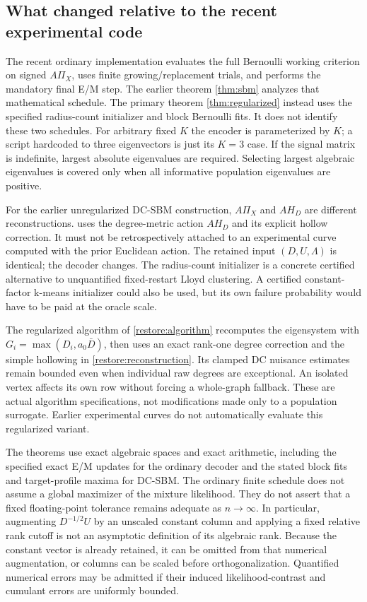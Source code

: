 \subsection{What changed relative to the recent experimental code}

The recent ordinary implementation evaluates the full Bernoulli working
criterion on signed $A\Pi_X$, uses finite growing/replacement trials, and
performs the mandatory final E/M step. The earlier theorem
\cref{thm:sbm} analyzes that mathematical schedule. The primary theorem
\cref{thm:regularized} instead uses the specified radius-count initializer
and block Bernoulli fits. It does not identify these two schedules.
For arbitrary fixed $K$ the encoder is parameterized
by $K$; a script hardcoded to three eigenvectors is just its $K=3$ case.
If the signal matrix is indefinite, largest absolute eigenvalues are
required. Selecting largest algebraic eigenvalues is covered only when
all informative population eigenvalues are positive.

For the earlier unregularized DC-SBM construction,
$A\Pi_X$ and $AH_D$ are different reconstructions.
 uses the degree-metric action
$AH_D$ and its explicit hollow correction. It must not be retrospectively
attached to an experimental curve computed with the prior Euclidean
action. The retained input $(D,U,\Lambda)$ is identical; the decoder
changes. The radius-count initializer is a concrete certified alternative
to unquantified fixed-restart Lloyd clustering. A certified constant-factor
k-means initializer could also be used, but its own failure probability
would have to be paid at the oracle scale.

The regularized algorithm of \cref{restore:algorithm} recomputes the
eigensystem with $G_i=\max(D_i,a_0\bar D)$, then uses an exact rank-one
degree correction and the simple hollowing in
\eqref{restore:reconstruction}. Its clamped DC nuisance estimates remain
bounded even when individual raw degrees are exceptional.
An isolated vertex affects its own row without forcing a whole-graph
fallback. These are actual algorithm specifications, not modifications
made only to a population surrogate. Earlier experimental curves do
not automatically evaluate this regularized variant.

The theorems use exact algebraic spaces and exact arithmetic, including
the specified exact E/M updates for the ordinary decoder and the stated
block fits and target-profile maxima for DC-SBM. The ordinary finite
schedule does not assume a global maximizer of the mixture likelihood.
They do not assert that a fixed floating-point tolerance remains adequate
as $n\to\infty$. In particular, augmenting $D^{-1/2}U$ by an unscaled
constant column and applying a fixed relative rank cutoff is not an
asymptotic definition of its algebraic rank. Because the constant vector is
already retained, it can be omitted from that numerical augmentation, or
columns can be scaled before orthogonalization. Quantified numerical
errors may be admitted if their induced likelihood-contrast and
cumulant errors are uniformly bounded.


